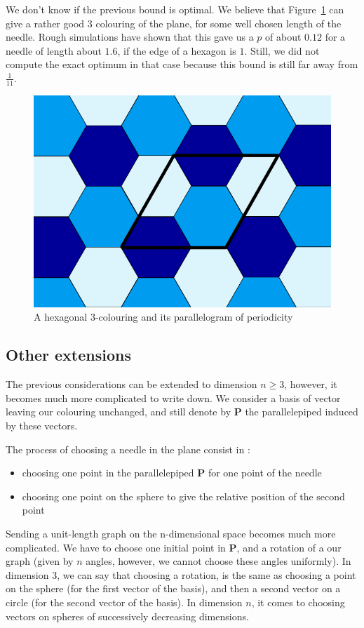 \documentclass[a4paper,11pt]{article}
\theoremstyle{definition}
\theoremstyle{remark}
\begin{document}
We don't know if the previous bound is optimal. We believe that Figure~\ref{trois} 
can give a rather good $3$ colouring of the plane, for some well chosen length 
of the needle. Rough simulations have shown that this gave us a $p$ of about 
$0.12$ for a needle of length about $1.6$, if the edge of a hexagon is $1$. 
Still, we did not compute the exact optimum in that case because this bound is 
still far away from $\frac{1}{11}$.

\begin{figure}[h]
\center
\includegraphics[scale=0.5]{trois.png}
\caption{\label{trois} A hexagonal $3$-colouring and its parallelogram of periodicity}
\end{figure}

\subsection{Other extensions}
\label{dim}

The previous considerations can be extended to dimension $n \geq 3$, however, 
it becomes much more complicated to write down. We consider a basis of vector 
leaving our colouring unchanged, and still denote by $\mathbf{P}$ the parallelepiped
induced by these vectors.

The process of choosing a needle in the plane consist in : 
\begin{itemize}
	\item choosing one point in the parallelepiped $ \mathbf{P} $ for one point of the needle
	\item choosing one point on the sphere to give the relative position of the second point
\end{itemize}
Sending a unit-length graph on the n-dimensional space becomes much more complicated. We have to choose 
one initial point in $ \mathbf{P} $, and a rotation of a our graph (given by $n$ angles, however, we cannot choose these angles uniformly).
In dimension 3, we can say that choosing a rotation, is the same as choosing a point on the sphere (for the 
first vector of the basis), and then a second vector on a circle (for the second vector of the basis). In dimension $n$, it comes to choosing vectors on spheres of successively decreasing dimensions. 
\end{document}
